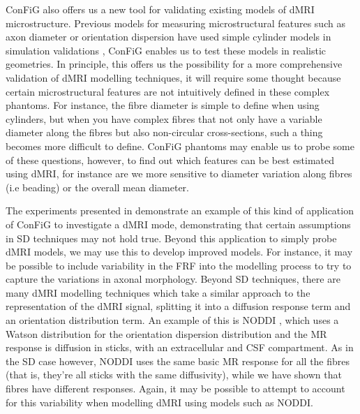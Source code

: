 \ac{ConFiG} also offers us a new tool for validating existing models of \ac{dMRI} microstructure. Previous models for measuring microstructural features such as axon diameter or orientation dispersion have used simple cylinder models in simulation validations \cite{Alexander2017,Zhang2012,Zhang2011,Alexander2010}, \ac{ConFiG} enables us to test these models in realistic geometries.
In principle, this offers us the possibility for a more comprehensive validation of \ac{dMRI} modelling techniques, it will require some thought because certain microstructural features are not intuitively defined in these complex phantoms.
For instance, the fibre diameter is simple to define when using cylinders, but when you have complex fibres that not only have a variable diameter along the fibres but also non-circular cross-sections, such a thing becomes more difficult to define.
\ac{ConFiG} phantoms may enable us to probe some of these questions, however, to find out which features can be best estimated using \ac{dMRI}, for instance are we more sensitive to diameter variation along fibres (i.e beading) or the overall mean diameter.

The experiments presented in  demonstrate an example of this kind of application of \ac{ConFiG} to investigate a \ac{dMRI} mode, demonstrating that certain assumptions in \ac{SD} techniques may not hold true.
Beyond this application to simply probe \ac{dMRI} models, we may use this to develop improved models. For instance, it may be possible to include variability in the \ac{FRF} into the modelling process to try to capture the variations in axonal morphology.
Beyond \ac{SD} techniques, there are many \ac{dMRI} modelling techniques which take a similar approach to the representation of the \ac{dMRI} signal, splitting it into a diffusion response term and an orientation distribution term.
An example of this is \acf{NODDI} \cite{Zhang2012}, which uses a Watson distribution for the orientation dispersion distribution and the MR response is diffusion in sticks, with an extracellular and CSF compartment. 
As in the \ac{SD} case however, \ac{NODDI} uses the same basic MR response for all the fibres (that is, they're all sticks with the same diffusivity), while we have shown that fibres have different responses. Again, it may be possible to attempt to account for this variability when modelling \ac{dMRI} using models such as \ac{NODDI}.

